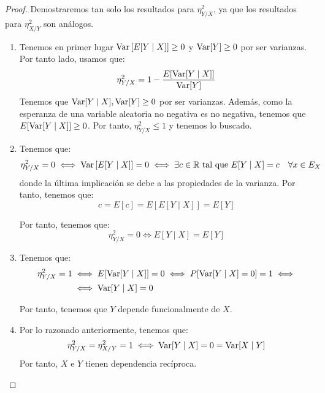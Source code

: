 \begin{proof}
    Demostraremos tan solo los resultados para $\eta_{Y/X}^2$, ya que los resultados para $\eta_{X/Y}^2$ son análogos.
    \begin{enumerate}
        \item Tenemos en primer lugar  $\operatorname{Var}\left[E[Y\mid X]\right]\geq 0$ y $\operatorname{Var}[Y]\geq 0$ por ser varianzas. Por tanto lado, usamos que:
        \begin{equation*}
            \eta_{Y/X}^2 = 1-\dfrac{E[\operatorname{Var}[Y\mid X]]}{\operatorname{Var}[Y]}
        \end{equation*}
        Tenemos que $\operatorname{Var}[Y\mid X], \operatorname{Var}[Y]\geq 0$ por ser varianzas. Además, como la esperanza de una variable aleatoria no negativa es no negativa, tenemos que $E[\operatorname{Var}[Y\mid X]]\geq 0$. Por tanto, $\eta_{Y/X}^2\leq 1$ y tenemos lo buscado.

        \item Tenemos que:
        \begin{equation*}
            \eta_{Y/X}^2 = 0 \iff \operatorname{Var}\left[E[Y\mid X]\right] = 0 \iff \exists c\in \mathbb{R} \text{ tal que } E[Y\mid X] = c\quad \forall x\in E_X
        \end{equation*}
        donde la última implicación se debe a las propiedades de la varianza.
        Por tanto, tenemos que:
        \begin{equation*}
            c = E[c] = E[E[Y\mid X]] = E[Y]
        \end{equation*}

        Por tanto, tenemos que:
        \begin{equation*}
            \eta_{Y/X}^2 = 0 \iff E[Y\mid X] = E[Y]
        \end{equation*}

        \item Tenemos que:
        \begin{align*}
            \eta_{Y/X}^2 = 1 &\iff E[\operatorname{Var}[Y\mid X]] = 0 \iff P[\operatorname{Var}[Y\mid X] = 0] = 1
            \iff\\&\iff
            \operatorname{Var}[Y\mid X] = 0
        \end{align*}

        Por tanto, tenemos que $Y$ depende funcionalmente de $X$.

        \item Por lo razonado anteriormente, tenemos que:
        \begin{equation*}
            \eta_{Y/X}^2 = \eta_{X/Y}^2 = 1 \iff \operatorname{Var}[Y\mid X] = 0 = \operatorname{Var}[X\mid Y]
        \end{equation*}
        Por tanto, $X$ e $Y$ tienen dependencia recíproca.
    \end{enumerate}
\end{proof}

